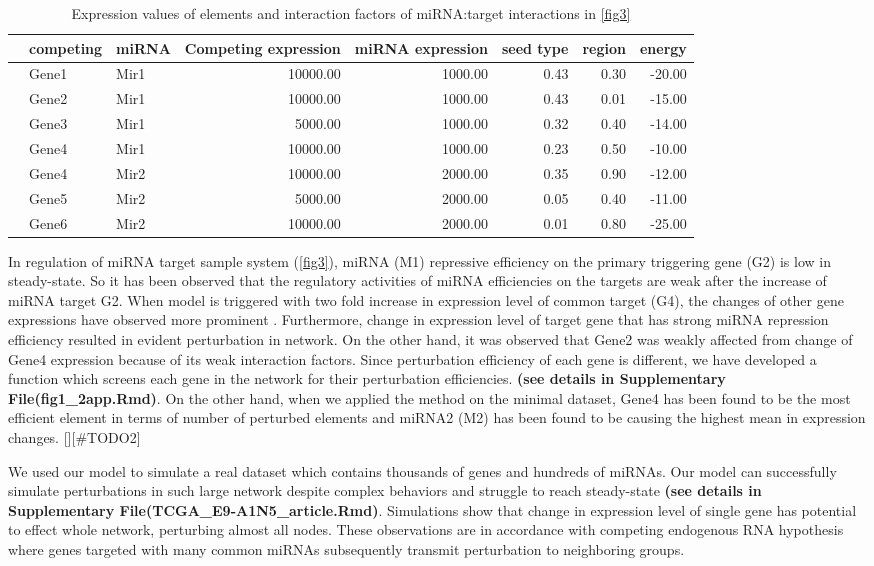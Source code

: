 \documentclass[]{article}
\begin{document}
\begin{table}[ht]
\centering
\caption{Expression values of elements and interaction factors of miRNA:target interactions in \autoref{fig3}} 
\begin{tabular}{rllrrrrr}
  \hline
 & competing & miRNA & Competing expression & miRNA expression & seed type & region & energy \\ 
  \hline
   & Gene1 & Mir1 & 10000.00 & 1000.00 & 0.43 & 0.30 & -20.00 \\ 
   & Gene2 & Mir1 & 10000.00 & 1000.00 & 0.43 & 0.01 & -15.00 \\ 
   & Gene3 & Mir1 & 5000.00 & 1000.00 & 0.32 & 0.40 & -14.00 \\ 
   & Gene4 & Mir1 & 10000.00 & 1000.00 & 0.23 & 0.50 & -10.00 \\ 
   & Gene4 & Mir2 & 10000.00 & 2000.00 & 0.35 & 0.90 & -12.00 \\ 
   & Gene5 & Mir2 & 5000.00 & 2000.00 & 0.05 & 0.40 & -11.00 \\ 
   & Gene6 & Mir2 & 10000.00 & 2000.00 & 0.01 & 0.80 & -25.00 \\ 
   \hline
\end{tabular}
\label{tab:one}
\end{table}

In regulation of miRNA target sample system (\autoref{fig3}), miRNA (M1)
repressive efficiency on the primary triggering gene (G2) is low in
steady-state. So it has been observed that the regulatory activities of
miRNA efficiencies on the targets are weak after the increase of miRNA
target G2. When model is triggered with two fold increase in expression
level of common target (G4), the changes of other gene expressions have
observed more prominent \href{}{}. Furthermore, change in expression
level of target gene that has strong miRNA repression efficiency
resulted in evident perturbation in network. On the other hand, it was
observed that Gene2 was weakly affected from change of Gene4 expression
because of its weak interaction factors. Since perturbation efficiency
of each gene is different, we have developed a function which screens
each gene in the network for their perturbation efficiencies.
\textbf{(see details in Supplementary File(fig1\_2app.Rmd)}. On the
other hand, when we applied the method on the minimal dataset, Gene4 has
been found to be the most efficient element in terms of number of
perturbed elements and miRNA2 (M2) has been found to be causing the
highest mean in expression changes. {[}{]}{[}\#TODO2{]}

\href{}{} We used our model to simulate a real dataset which contains
thousands of genes and hundreds of miRNAs. Our model can successfully
simulate perturbations in such large network despite complex behaviors
and struggle to reach steady-state \textbf{(see details in Supplementary
File(TCGA\_E9-A1N5\_article.Rmd)}. Simulations show that change in
expression level of single gene has potential to effect whole network,
perturbing almost all nodes. These observations are in accordance with
competing endogenous RNA hypothesis where genes targeted with many
common miRNAs subsequently transmit perturbation to neighboring groups.
\end{document}
